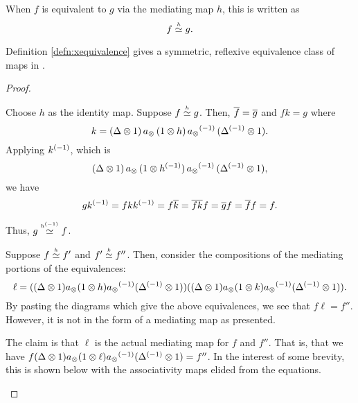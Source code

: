 \begin{notation}
  When $f$ is equivalent to $g$ via the mediating map $h$, this is written as
  \[
    f\overset{\scriptscriptstyle h}{\simeq}g.
  \]
\end{notation}


\begin{lemma}\label{lem:mediating_map_equivalence_is_symmetric_reflexive_and_transitive}
  Definition \vref{defn:xequivalence} gives a symmetric, reflexive equivalence class of maps in \X.
\end{lemma}
\begin{proof}
  \prepprooflist
  \begin{description}
     Choose $h$ as the identity map.
     Suppose $f\overset{\scriptscriptstyle h}{\simeq}g$. Then, $\overline{f} = \overline{g}$ and $f k = g$ where
      \[
        k = (\Delta\otimes 1) \, a_{\otimes}\, (1\otimes h)\, {a_{\otimes}}^{(-1)}\,({\Delta}^{(-1)}\otimes 1).
      \] Applying ${k}^{(-1)}$,
      which is
      \[
        (\Delta\otimes 1) \, a_{\otimes}\, (1\otimes{h}^{(-1)})\, {a_{\otimes}}^{(-1)}\,({\Delta}^{(-1)}\otimes 1),
      \]
      we have
      \[
        g {k}^{(-1)} = f k {k}^{(-1)} = f \overline{k} = \overline{f k} f
        = \overline{g} f = \overline{f} f = f.
      \]

      Thus, $g\overset{\scriptscriptstyle {h}^{(-1)}}{\simeq} f$.

     Suppose $f\overset{\scriptscriptstyle h}{\simeq} f'$ and $f' \overset{\scriptscriptstyle k}{\simeq} f''$. Then, consider the
      compositions of the mediating portions of the equivalences:
      \[
        \ell = ((\Delta \otimes 1)  a_{\otimes}  (1 \otimes h ) {a_{\otimes}}^{(-1)} ({\Delta}^{(-1)}\otimes 1))
          ( (\Delta \otimes 1) a_{\otimes}  (1 \otimes k) {a_{\otimes}}^{(-1)} ({\Delta}^{(-1)}\otimes 1)).
      \]
      By pasting the diagrams which give the above equivalences, we see that $f \ell = f''$.
      However, it is not in the form of a mediating map as presented.

      The claim is that $\ell$ is the actual mediating map for $f$ and $f''$. That is, that we have
      $f(\Delta \otimes 1)a_{\otimes}(1 \otimes \ell){a_{\otimes}}^{(-1)}({\Delta}^{(-1)}\otimes1) = f''$. In the interest of some
      brevity, this is shown below with the associativity maps elided from the equations.


\end{description}
\end{proof}
